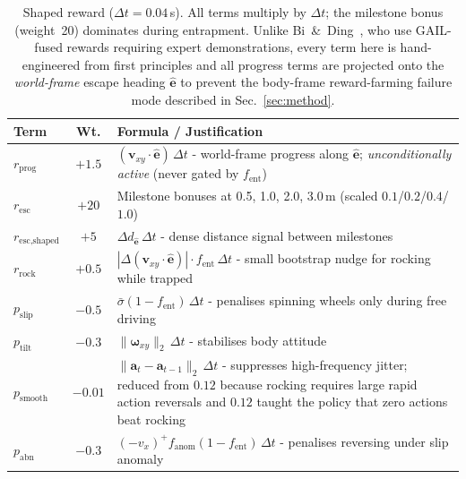 \documentclass[conference]{IEEEtran}
\begin{document}
\begin{table}[!htbp]
  \centering
  \caption{Shaped reward ($\Delta t{=}0.04$\,s). All terms multiply by $\Delta t$;
    the milestone bonus (weight~20) dominates during entrapment. Unlike
    Bi~\&~Ding~\cite{bi2026escape}, who use GAIL-fused rewards requiring expert
    demonstrations, every term here is hand-engineered from first principles and
    all progress terms are projected onto the \emph{world-frame} escape heading
    $\hat{\mathbf{e}}$ to prevent the body-frame reward-farming failure mode
    described in Sec.~\ref{sec:method}.}
  \label{tab:reward}
  \renewcommand{\arraystretch}{1.25}
  \begin{tabular}{@{}lcp{4.0cm}@{}}
    \toprule
    \textbf{Term} & \textbf{Wt.} & \textbf{Formula / Justification} \\
    \midrule
    $r_{\text{prog}}$
      & $+1.5$
      & $(\mathbf{v}_{xy} \cdot \hat{\mathbf{e}})\,\Delta t$ - world-frame
        progress along $\hat{\mathbf{e}}$; \emph{unconditionally active}
        (never gated by $f_{\text{ent}}$) \\[2pt]
    $r_{\text{esc}}$
      & $+20$
      & Milestone bonuses at 0.5, 1.0, 2.0, 3.0\,m
        (scaled $0.1$/$0.2$/$0.4$/$1.0$) \\[2pt]
    $r_{\text{esc,shaped}}$
      & $+5$
      & $\Delta d_{\hat{\mathbf{e}}} \,\Delta t$ - dense distance signal between
        milestones \\[2pt]
    $r_{\text{rock}}$
      & $+0.5$
      & $|\Delta (\mathbf{v}_{xy}\!\cdot\!\hat{\mathbf{e}})| \cdot f_\text{ent}\,
         \Delta t$ - small bootstrap nudge for rocking while trapped \\[2pt]
    $p_{\text{slip}}$
      & $-0.5$
      & $\bar{\sigma}(1{-}f_\text{ent})\,\Delta t$ - penalises spinning wheels
        only during free driving \\[2pt]
    $p_{\text{tilt}}$
      & $-0.3$
      & $\|\boldsymbol{\omega}_{xy}\|_2\,\Delta t$ - stabilises body attitude
        \\[2pt]
    $p_{\text{smooth}}$
      & $-0.01$
      & $\|\mathbf{a}_t {-} \mathbf{a}_{t-1}\|_2\,\Delta t$ - suppresses
        high-frequency jitter; reduced from $0.12$ because rocking requires
        large rapid action reversals and $0.12$ taught the policy that zero
        actions beat rocking \\[2pt]
    $p_{\text{abn}}$
      & $-0.3$
      & $(-v_x)^+\! f_\text{anom}(1{-}f_\text{ent})\,\Delta t$ - penalises
        reversing under slip anomaly \\[2pt]

\end{tabular}
\end{table}
\end{document}
